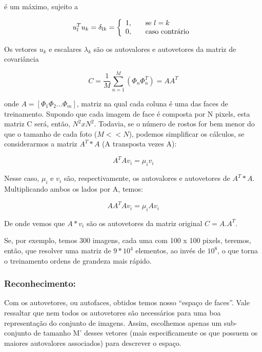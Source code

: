 \documentclass[10pt,a4paper]{article}
\begin{document}
é um máximo, sujeito a

\begin{equation}
  u_l^Tu_k=\delta_{lk}=\left \{
    \begin{array}{l l}
      1, & \quad \text{se $l=k$} \\
      0, & \quad \text{caso contrário}\\
    \end{array}
  \right.
\end{equation}

Os vetores $u_k$ e escalares $\lambda_k$ são os autovalores e autovetores da matriz de covariância

\begin{equation}
  C=\frac{1}{M}\sum_{n=1}^{M}(\Phi_n\Phi_n^T)= AA^T
\end{equation}

onde $A = [ \Phi_1 \Phi_2 \ldots \Phi_m ]$, matriz na qual cada coluna
é uma das faces de treinamento. Supondo que cada imagem de face é
composta por N pixels, esta matriz C será, então, $N^2 x
N^2$. Todavia, se o número de rostos for bem menor do que o tamanho de
cada foto ($M << N$), podemos simplificar os cálculos, se
considerarmos a matriz $A^T * A$ (A transposta vezes A):

\begin{equation}
  A^TAv_i=\mu_iv_i
\end{equation}


Nesse caso, $\mu_i$ e $v_i$ são, respectivamente, os autovalores e
autovetores de $A^T * A$. Multiplicando ambos os lados por A, temos:

\begin{equation}
  AA^TAv_i=\mu_iAv_i
\end{equation}


De onde vemos que $A*v_i$ são os autovetores da matriz original $C = A.A^T$.

Se, por exemplo, temos 300 imagens, cada uma com 100 x 100 pixels,
teremos, então, que resolver uma matriz de $9*10^4$ elementos, ao
invés de $10^8$, o que torna o treinamento ordens de grandeza mais rápido.


\subsubsection*{Reconhecimento:}

Com os autovetores, ou autofaces, obtidos temos nosso “espaço de
faces”. Vale ressaltar que nem todos os autovetores são necessários
para uma boa representação do conjunto de imagens. Assim, escolhemos
apenas um sub-conjunto de tamanho M’ desses vetores (mais
especificamente os que possuem os maiores autovalores associados) para
descrever o espaço.
\end{document}
